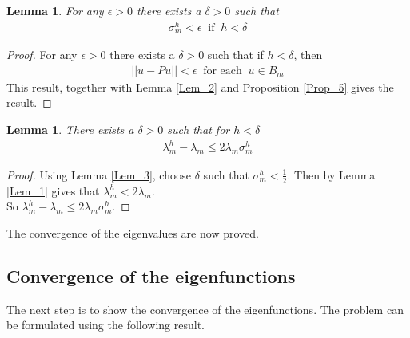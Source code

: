 \documentclass[../../main.tex]{subfiles}
\begin{document}
\newtheorem{Lem_3}[Lem_1]{Lemma} \label{Lem_3}
\begin{Lem_3}
	For any $\epsilon >0$ there exists a $\delta > 0$ such that
	\begin{eqnarray*}
	\sigma_{m}^{h} < \epsilon \ \textrm{ if } \ h < \delta
	\end{eqnarray*}
\end{Lem_3}
\begin{proof}
	For any $\epsilon > 0$ there exists a $\delta > 0$ such that if $h<\delta$, then
	\begin{eqnarray*}
	||u-Pu|| < \epsilon \ \textrm{ for each } \ u \in B_{m}
	\end{eqnarray*}
	This result, together with Lemma \ref{Lem_2} and Proposition \ref{Prop_5} gives the result.
\end{proof}

\newtheorem{Lem_4}[Lem_1]{Lemma} \label{Lem_4}
\begin{Lem_4}
	There exists a $\delta > 0$ such that for $h < \delta$
	\begin{eqnarray*}
	\lambda_{m}^{h} - \lambda_{m} \leq 2\lambda_{m}\sigma_{m}^{h}
	\end{eqnarray*}
\end{Lem_4}
\begin{proof}
	Using Lemma \ref{Lem_3}, choose $\delta$ such that $\sigma_{m}^{h} < \frac{1}{2}$. Then by Lemma \ref{Lem_1} gives that $\lambda_{m}^{h} < 2\lambda_{m}$.\\
	
	So $\lambda_{m}^{h} - \lambda_{m} \leq 2\lambda_{m}\sigma_{m}^{h}$.
\end{proof}

The convergence of the eigenvalues are now proved.\\

\subsection{Convergence of the eigenfunctions}
The next step is to show the convergence of the eigenfunctions. The problem can be formulated using the following result.
\end{document}
